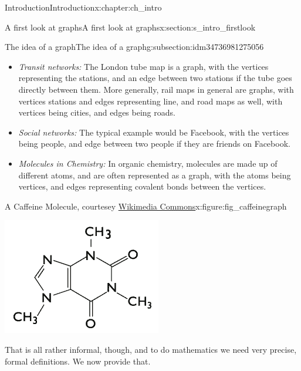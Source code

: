 \documentclass[oneside,10pt,]{book}
\numberwithin{equation}{section}
\begin{document}
\begin{chapterptx}{Introduction}{}{Introduction}{}{}{x:chapter:ch_intro}
\begin{sectionptx}{A first look at graphs}{}{A first look at graphs}{}{}{x:section:s_intro_firstlook}
\begin{subsectionptx}{The idea of a graph}{}{The idea of a graph}{}{}{g:subsection:idm34736981275056}
\begin{itemize}[label=\textbullet]
\item{}\emph{Transit networks:} The London tube map is a graph, with the vertices representing the stations, and an edge between two stations if the tube goes directly between them.  More generally, rail maps in general are graphs, with vertices stations and edges representing line, and road maps as well, with vertices being cities, and edges being roads.%
\item{}\emph{Social networks:} The typical example would be Facebook, with the vertices being people, and edge between two people if they are friends on Facebook.%
\item{}\emph{Molecules in Chemistry:} In organic chemistry, molecules are made up of different atoms, and are often represented as a graph, with the atoms being vertices, and edges representing covalent bonds between the vertices.%
\end{itemize}
%
\begin{figureptx}{A Caffeine Molecule, courtesey \href{https://commons.wikimedia.org/wiki/File:Caffeine_molecule.png}{Wikimedia Commons}}{x:figure:fig_caffeinegraph}{}%
\begin{image}{0.05}{0.9}{0.05}%
\includegraphics[width=\linewidth]{images/Caffeine_molecule.png}
\end{image}%
\tcblower
\end{figureptx}%
That is all rather informal, though, and to do mathematics we need very precise, formal definitions.  We now provide that.%
\end{subsectionptx}
%
%
\typeout{************************************************}

\end{sectionptx}
\end{chapterptx}
\end{document}

